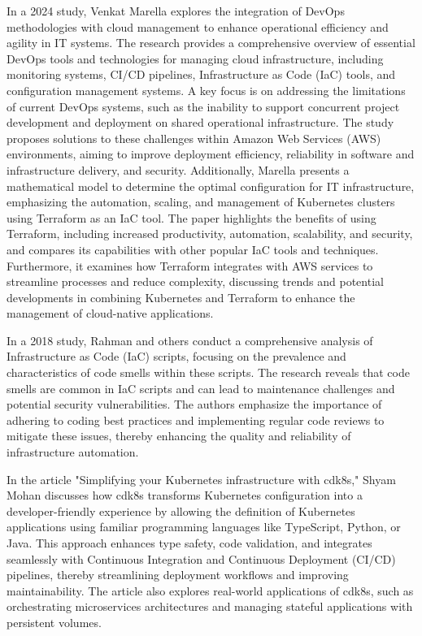 \documentclass{article}
\begin{document}
In a 2024 study, Venkat Marella explores the integration of DevOps methodologies with cloud management to enhance operational efficiency and agility in IT systems. The research provides a comprehensive overview of essential DevOps tools and technologies for managing cloud infrastructure, including monitoring systems, CI/CD pipelines, Infrastructure as Code (IaC) tools, and configuration management systems. A key focus is on addressing the limitations of current DevOps systems, such as the inability to support concurrent project development and deployment on shared operational infrastructure. The study proposes solutions to these challenges within Amazon Web Services (AWS) environments, aiming to improve deployment efficiency, reliability in software and infrastructure delivery, and security. Additionally, Marella presents a mathematical model to determine the optimal configuration for IT infrastructure, emphasizing the automation, scaling, and management of Kubernetes clusters using Terraform as an IaC tool. The paper highlights the benefits of using Terraform, including increased productivity, automation, scalability, and security, and compares its capabilities with other popular IaC tools and techniques. Furthermore, it examines how Terraform integrates with AWS services to streamline processes and reduce complexity, discussing trends and potential developments in combining Kubernetes and Terraform to enhance the management of cloud-native applications. \cite{lit-3}

In a 2018 study, Rahman and others conduct a comprehensive analysis of Infrastructure as Code (IaC) scripts, focusing on the prevalence and characteristics of code smells within these scripts. The research reveals that code smells are common in IaC scripts and can lead to maintenance challenges and potential security vulnerabilities. The authors emphasize the importance of adhering to coding best practices and implementing regular code reviews to mitigate these issues, thereby enhancing the quality and reliability of infrastructure automation. \cite{lit-4}

In the article "Simplifying your Kubernetes infrastructure with cdk8s," Shyam Mohan discusses how cdk8s transforms Kubernetes configuration into a developer-friendly experience by allowing the definition of Kubernetes applications using familiar programming languages like TypeScript, Python, or Java. This approach enhances type safety, code validation, and integrates seamlessly with Continuous Integration and Continuous Deployment (CI/CD) pipelines, thereby streamlining deployment workflows and improving maintainability. The article also explores real-world applications of cdk8s, such as orchestrating microservices architectures and managing stateful applications with persistent volumes. \cite{lit-5}
\end{document}
